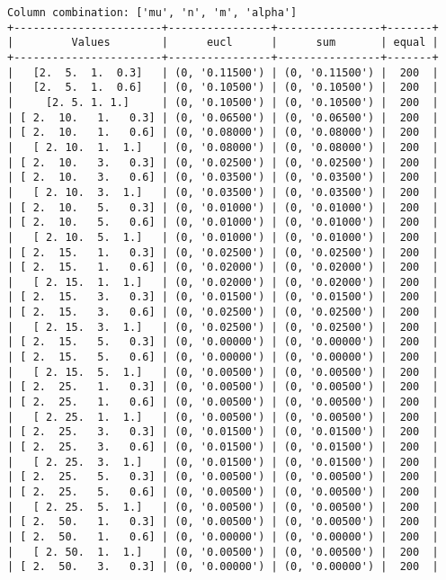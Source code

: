 \documentclass{article}
\begin{document}
\begin{verbatim}
Column combination: ['mu', 'n', 'm', 'alpha']
+-----------------------+----------------+----------------+-------+
|         Values        |      eucl      |      sum       | equal |
+-----------------------+----------------+----------------+-------+
|   [2.  5.  1.  0.3]   | (0, '0.11500') | (0, '0.11500') |  200  |
|   [2.  5.  1.  0.6]   | (0, '0.10500') | (0, '0.10500') |  200  |
|     [2. 5. 1. 1.]     | (0, '0.10500') | (0, '0.10500') |  200  |
| [ 2.  10.   1.   0.3] | (0, '0.06500') | (0, '0.06500') |  200  |
| [ 2.  10.   1.   0.6] | (0, '0.08000') | (0, '0.08000') |  200  |
|   [ 2. 10.  1.  1.]   | (0, '0.08000') | (0, '0.08000') |  200  |
| [ 2.  10.   3.   0.3] | (0, '0.02500') | (0, '0.02500') |  200  |
| [ 2.  10.   3.   0.6] | (0, '0.03500') | (0, '0.03500') |  200  |
|   [ 2. 10.  3.  1.]   | (0, '0.03500') | (0, '0.03500') |  200  |
| [ 2.  10.   5.   0.3] | (0, '0.01000') | (0, '0.01000') |  200  |
| [ 2.  10.   5.   0.6] | (0, '0.01000') | (0, '0.01000') |  200  |
|   [ 2. 10.  5.  1.]   | (0, '0.01000') | (0, '0.01000') |  200  |
| [ 2.  15.   1.   0.3] | (0, '0.02500') | (0, '0.02500') |  200  |
| [ 2.  15.   1.   0.6] | (0, '0.02000') | (0, '0.02000') |  200  |
|   [ 2. 15.  1.  1.]   | (0, '0.02000') | (0, '0.02000') |  200  |
| [ 2.  15.   3.   0.3] | (0, '0.01500') | (0, '0.01500') |  200  |
| [ 2.  15.   3.   0.6] | (0, '0.02500') | (0, '0.02500') |  200  |
|   [ 2. 15.  3.  1.]   | (0, '0.02500') | (0, '0.02500') |  200  |
| [ 2.  15.   5.   0.3] | (0, '0.00000') | (0, '0.00000') |  200  |
| [ 2.  15.   5.   0.6] | (0, '0.00000') | (0, '0.00000') |  200  |
|   [ 2. 15.  5.  1.]   | (0, '0.00500') | (0, '0.00500') |  200  |
| [ 2.  25.   1.   0.3] | (0, '0.00500') | (0, '0.00500') |  200  |
| [ 2.  25.   1.   0.6] | (0, '0.00500') | (0, '0.00500') |  200  |
|   [ 2. 25.  1.  1.]   | (0, '0.00500') | (0, '0.00500') |  200  |
| [ 2.  25.   3.   0.3] | (0, '0.01500') | (0, '0.01500') |  200  |
| [ 2.  25.   3.   0.6] | (0, '0.01500') | (0, '0.01500') |  200  |
|   [ 2. 25.  3.  1.]   | (0, '0.01500') | (0, '0.01500') |  200  |
| [ 2.  25.   5.   0.3] | (0, '0.00500') | (0, '0.00500') |  200  |
| [ 2.  25.   5.   0.6] | (0, '0.00500') | (0, '0.00500') |  200  |
|   [ 2. 25.  5.  1.]   | (0, '0.00500') | (0, '0.00500') |  200  |
| [ 2.  50.   1.   0.3] | (0, '0.00500') | (0, '0.00500') |  200  |
| [ 2.  50.   1.   0.6] | (0, '0.00000') | (0, '0.00000') |  200  |
|   [ 2. 50.  1.  1.]   | (0, '0.00500') | (0, '0.00500') |  200  |
| [ 2.  50.   3.   0.3] | (0, '0.00000') | (0, '0.00000') |  200  |

\end{verbatim}
\end{document}
